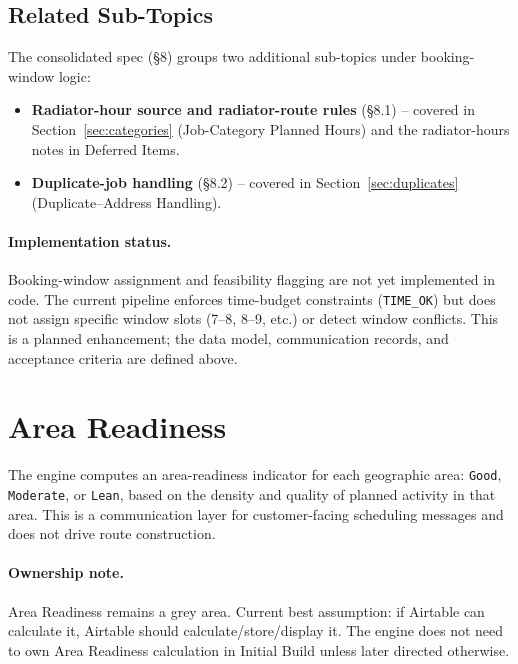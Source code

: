 \documentclass[12pt]{article}
\begin{document}
\subsection*{Related Sub-Topics}

The consolidated spec (\S8) groups two additional sub-topics under booking-window logic:
\begin{itemize}
    \item \textbf{Radiator-hour source and radiator-route rules} (\S8.1) -- covered in Section~\ref{sec:categories} (Job-Category Planned Hours) and the radiator-hours notes in Deferred Items.
    \item \textbf{Duplicate-job handling} (\S8.2) -- covered in Section~\ref{sec:duplicates} (Duplicate--Address Handling).
\end{itemize}

\paragraph{Implementation status.}
Booking-window assignment and feasibility flagging are not yet implemented in code.
The current pipeline enforces time-budget constraints (\texttt{TIME\_OK}) but does not assign specific window slots (7--8, 8--9, etc.) or detect window conflicts.
This is a planned enhancement; the data model, communication records, and acceptance criteria are defined above.

\section*{Area Readiness}

The engine computes an area-readiness indicator for each geographic area: \texttt{Good}, \texttt{Moderate}, or \texttt{Lean}, based on the density and quality of planned activity in that area.
This is a communication layer for customer-facing scheduling messages and does not drive route construction.

\paragraph{Ownership note.}
Area Readiness remains a grey area.
Current best assumption: if Airtable can calculate it, Airtable should calculate/store/display it.
The engine does not need to own Area Readiness calculation in Initial Build unless later directed otherwise.
\end{document}
